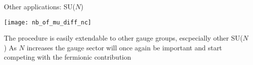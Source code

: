 \begin{frame}{Other applications: SU($N$)}

  \begin{center}
    \texttt{[image: nb\_of\_mu\_diff\_nc]}
  \end{center}

  \vspace*{-.5cm}

  \begin{overprint}
      The procedure is easily extendable to \alert{other gauge groups}, escpecially
      other SU($N$)
      As $N$ increases the \alert{gauge sector} will once again be
      \alert{important} and start competing with the fermionic contribution
  \end{overprint}

\end{frame}
